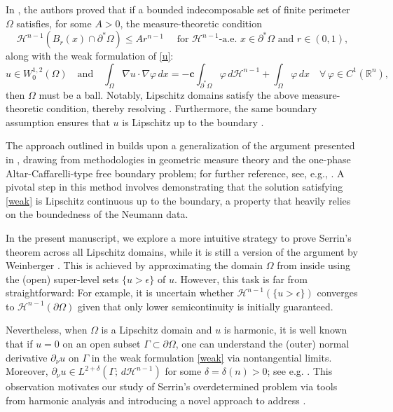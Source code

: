\documentclass[reqno,11pt]{amsart}
\def\dz{\delta}
\def\ez{\epsilon}
\numberwithin{equation}{section}
\theoremstyle{remark}
\begin{document}
In \cite{FZ2025}, the authors proved that if a bounded indecomposable set of finite perimeter $\Omega$ satisfies, for some $A>0$, the measure-theoretic condition
\begin{equation}\label{FZ measure density}
    \mathscr H^{n-1}(B_r(x)\cap \partial^* \Omega)\le A r^{n-1} \quad \text{ for $\mathscr H^{n-1}$-a.e. } x\in \partial^* \Omega \text{ and $r \in (0,1)$,}
\end{equation}  
along with the weak formulation of \eqref{u}:
\begin{equation}\label{weak}
    u \in W^{1,2}_0(\Omega)\quad\text{and}\quad \int_{\Omega} \nabla u\cdot \nabla\varphi \, dx = -\mathbf{c}\int_{\partial^* \Omega} \varphi \, d\mathscr{H}^{n-1} + \int_{\Omega} \varphi \, dx\quad \forall\, \varphi\in C^1(\mathbb{R}^n),
\end{equation}
then $\Omega$ must be a ball. 
Notably, Lipschitz domains satisfy the above measure-theoretic condition, thereby resolving \cite[Question 7.1]{HLL2024}. Furthermore, the same boundary assumption ensures that $u$ is Lipschitz up to the boundary \cite[Lemma 2.1]{FZ2025}. 

The approach outlined in \cite{FZ2025} builds upon a generalization of the argument presented in \cite{W1971}, drawing from methodologies in geometric measure theory and the one-phase Altar-Caffarelli-type free boundary problem; for further reference, see, e.g., \cite{V2023}. A pivotal step in this method involves demonstrating that the solution satisfying \eqref{weak} is Lipschitz continuous up to the boundary, a property that heavily relies on the boundedness of the Neumann data. 

In the present manuscript, we explore a more intuitive strategy to prove Serrin's theorem across all Lipschitz domains, while it is still a version of the argument by Weinberger \cite{W1971}. This is achieved by approximating the domain $\Omega$ from inside using the (open) super-level sets $\{u>\ez\}$ of $u$.  However, this task is far from straightforward: For example, it is  uncertain whether  $\mathscr H ^{n-1}(\{u>\ez\})$ converges to $\mathscr H ^{n-1}(\partial \Omega)$ given that only lower semicontinuity is initially guaranteed. 

Nevertheless, when $\Omega$ is a Lipschitz domain and $u$ is harmonic, it is well known that if $u=0$ on an open subset $\Gamma\subset \partial\Omega$, one can understand the (outer) normal derivative $\partial_\nu u$ on $\Gamma$ in the weak formulation \eqref{weak} via nontangential limits. Moreover, $\partial_\nu u\in L^{2+\dz}(\Gamma;\,d\mathscr H^{n-1})$ for some $\dz=\dz(n)>0$; see e.g. \cite{C1985}. 
This observation motivates our study of  Serrin's overdetermined problem via tools from harmonic analysis and introducing a novel approach to address \cite[Question 7.1]{HLL2024}.  
\end{document}
